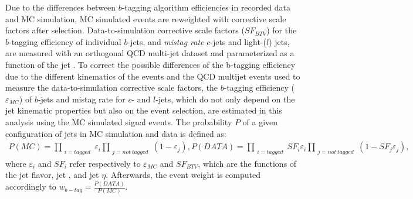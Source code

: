Due to the differences between $b$-tagging algorithm efficiencies in recorded data and MC simulation, MC simulated events are reweighted with corrective scale factors after selection.
Data-to-simulation corrective scale factors ($SF_{BTV}$) for the $b$-tagging efficiency of individual $b$-jets, and \textit{mistag rate} $c$-jets and light-($l$) jets, are measured with an orthogonal QCD multi-jet dataset and parameterized as a function of the jet \pT.
To correct the possible differences of the b-tagging efficiency due to the different kinematics of the \ttbar events and the QCD multijet events used to measure the data-to-simulation corrective scale factors, the $b$-tagging efficiency ($\varepsilon_{MC}$) of $b$-jets and mistag rate for $c$- and $l$-jets, which do not only depend on the jet kinematic properties but also on the event selection, are estimated in this analysis using the MC simulated \ttbar signal events.
The probability $P$ of a given configuration of jets in MC simulation and data is defined as:
\begin{align}
P(MC) = \prod_{\substack{i=tagged}} \varepsilon_i \prod_{\substack{j=not~tagged}} (1 - \varepsilon_j),
P(DATA) = \prod_{\substack{i=tagged}} SF_i\varepsilon_i \prod_{\substack{j=not~tagged}} (1 - SF_j\varepsilon_j),
\end{align}
where $\varepsilon_i$ and $ SF_i $ refer respectively to $\varepsilon_{MC}$ and $SF_{BTV}$, which are the functions of the jet flavor, jet \pT, and jet $\eta$. 
Afterwards, the event weight is computed accordingly to $w_{b-tag} = \frac{P(DATA)}{P(MC)}$.